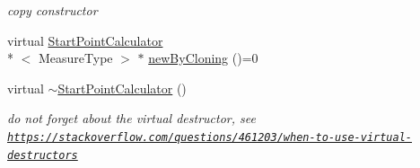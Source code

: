 \begin{DoxyCompactItemize}
\begin{DoxyCompactList}\small\item\em copy constructor \end{DoxyCompactList}\item 
virtual \hyperlink{class_ox_1_1_start_point_calculator}{Start\-Point\-Calculator}\\*
$<$ Measure\-Type $>$ $\ast$ \hyperlink{class_ox_1_1_start_point_calculator_acd2a221872002157f232e1e7f73a1859}{new\-By\-Cloning} ()=0
\item 
\hypertarget{class_ox_1_1_start_point_calculator_a210c3312a8926b750dba8e498c6b620a}{virtual \hyperlink{class_ox_1_1_start_point_calculator_a210c3312a8926b750dba8e498c6b620a}{$\sim$\-Start\-Point\-Calculator} ()}\label{class_ox_1_1_start_point_calculator_a210c3312a8926b750dba8e498c6b620a}

\begin{DoxyCompactList}\small\item\em do not forget about the virtual destructor, see \href{https://stackoverflow.com/questions/461203/when-to-use-virtual-destructors}{\tt https\-://stackoverflow.\-com/questions/461203/when-\/to-\/use-\/virtual-\/destructors} \end{DoxyCompactList}\end{DoxyCompactItemize}
